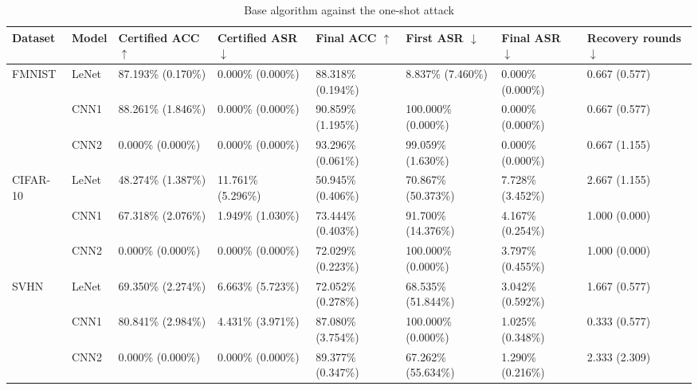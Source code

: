 \documentclass[conference,compsoc]{IEEEtran}
\begin{document}
\begin{landscape}

\begin{table}[H]
\centering
\caption{Base algorithm against the one-shot attack}
\begin{tabular}{llllllll}
\hline
\textbf{Dataset} & \textbf{Model} & \textbf{Certified ACC} $\uparrow$ & \textbf{Certified ASR} $\downarrow$ & \textbf{Final ACC} $\uparrow$ & \textbf{First ASR} $\downarrow$ & \textbf{Final ASR} $\downarrow$ & \textbf{Recovery rounds} $\downarrow$ \\
\hline
\multirow{3}{*}{FMNIST} & LeNet & 87.193\% (0.170\%) & 0.000\% (0.000\%) & 88.318\% (0.194\%) & 8.837\% (7.460\%) & 0.000\% (0.000\%) & 0.667 (0.577) \\
& CNN1 & 88.261\% (1.846\%) & 0.000\% (0.000\%) & 90.859\% (1.195\%) & 100.000\% (0.000\%) & 0.000\% (0.000\%) & 0.667 (0.577) \\
& CNN2 & 0.000\% (0.000\%) & 0.000\% (0.000\%) & 93.296\% (0.061\%) & 99.059\% (1.630\%) & 0.000\% (0.000\%) & 0.667 (1.155) \\
\hline
\multirow{3}{*}{CIFAR-10} & LeNet & 48.274\% (1.387\%) & 11.761\% (5.296\%) & 50.945\% (0.406\%) & 70.867\% (50.373\%) & 7.728\% (3.452\%) & 2.667 (1.155) \\
& CNN1 & 67.318\% (2.076\%) & 1.949\% (1.030\%) & 73.444\% (0.403\%) & 91.700\% (14.376\%) & 4.167\% (0.254\%) & 1.000 (0.000) \\
& CNN2 & 0.000\% (0.000\%) & 0.000\% (0.000\%) & 72.029\% (0.223\%) & 100.000\% (0.000\%) & 3.797\% (0.455\%) & 1.000 (0.000) \\
\hline
\multirow{3}{*}{SVHN} & LeNet & 69.350\% (2.274\%) & 6.663\% (5.723\%) & 72.052\% (0.278\%) & 68.535\% (51.844\%) & 3.042\% (0.592\%) & 1.667 (0.577) \\
& CNN1 & 80.841\% (2.984\%) & 4.431\% (3.971\%) & 87.080\% (3.754\%) & 100.000\% (0.000\%) & 1.025\% (0.348\%) & 0.333 (0.577) \\
& CNN2 & 0.000\% (0.000\%) & 0.000\% (0.000\%) & 89.377\% (0.347\%) & 67.262\% (55.634\%) & 1.290\% (0.216\%) & 2.333 (2.309) \\
\hline
\end{tabular}
\end{table}


\end{landscape}
\end{document}
